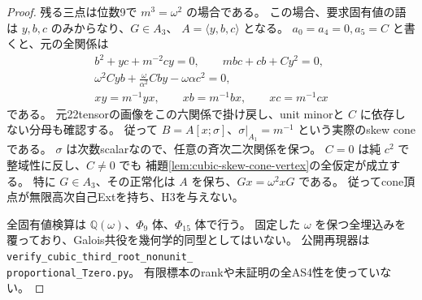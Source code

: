 \begin{proof}
残る三点は位数9で $m^3=\omega^2$ の場合である。
この場合、要求固有値の語は $y,b,c$ のみからなり、$G\in A_3$、
$A=\langle y,b,c\rangle$ となる。
$a_0=a_4=0,a_5=C$ と書くと、元の全関係は
\begin{gather*}
 b^2+yc+m^{-2}cy=0,\qquad m bc+cb+C y^2=0,\\
 \omega^2Cyb+\frac\omega{\alpha^2}Cby-\omega\alpha c^2=0,\\
 xy=m^{-1}yx,\qquad xb=m^{-1}bx,\qquad xc=m^{-1}cx
\end{gather*}
である。
元22tensorの画像をこの六関係で掛け戻し、unit minorと $C$ に依存しない分母も確認する。
従って $B=A[x;\sigma]$、$\sigma|_{A_1}=m^{-1}$ という実際のskew coneである。
$\sigma$ は次数scalarなので、任意の斉次二次関係を保つ。
$C=0$ は純 $c^2$ で整域性に反し、$C\ne0$ でも
補題\ref{lem:cubic-skew-cone-vertex}の全仮定が成立する。
特に $G\in A_3$、その正常化は $A$ を保ち、$Gx=\omega^2xG$ である。
従ってcone頂点が無限高次自己Extを持ち、H3を与えない。

全固有値検算は $\mathbb Q(\omega)$、$\Phi_9$ 体、$\Phi_{15}$ 体で行う。
固定した $\omega$ を保つ全埋込みを覆っており、Galois共役を幾何学的同型としてはいない。
公開再現器は \texttt{verify\_cubic\_third\_root\_nonunit\_}\\
\texttt{proportional\_Tzero.py}。
有限標本のrankや未証明の全AS4性を使っていない。
\end{proof}
